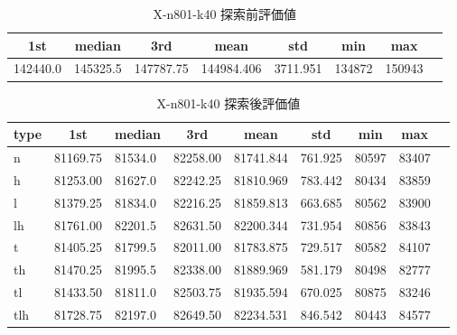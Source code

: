 \begin{table}[htbp]
    \centering
    \caption{X-n801-k40 探索前評価値}
    \begin{tabular}{|l|l|l|l|l|l|l|l|}\hline
    \multicolumn{1}{|c|}{\textbf{1st}}
    &\multicolumn{1}{c|}{\textbf{median}}
    &\multicolumn{1}{c|}{\textbf{3rd}}
    &\multicolumn{1}{c|}{\textbf{mean}}
    &\multicolumn{1}{c|}{\textbf{std}}
    &\multicolumn{1}{c|}{\textbf{min}}
    &\multicolumn{1}{c|}{\textbf{max}}\\\hline
	142440.0 & 145325.5 & 147787.75 & 144984.406 & 3711.951 & 134872 & 150943\\\hline
	\end{tabular}
\end{table}
\begin{table}[htbp]
    \centering
    \caption{X-n801-k40 探索後評価値}
    \begin{tabular}{|l|l|l|l|l|l|l|l|l|}\hline
    \multicolumn{1}{|c|}{\textbf{type}}
    &\multicolumn{1}{|c|}{\textbf{1st}}
    &\multicolumn{1}{c|}{\textbf{median}}
    &\multicolumn{1}{c|}{\textbf{3rd}}
    &\multicolumn{1}{c|}{\textbf{mean}}
    &\multicolumn{1}{c|}{\textbf{std}}
    &\multicolumn{1}{c|}{\textbf{min}}
    &\multicolumn{1}{c|}{\textbf{max}}\\\hline
	n & 81169.75 & 81534.0 & 82258.00 & 81741.844 & 761.925 & 80597 & 83407\\\hline
	h & 81253.00 & 81627.0 & 82242.25 & 81810.969 & 783.442 & 80434 & 83859\\\hline
	l & 81379.25 & 81834.0 & 82216.25 & 81859.813 & 663.685 & 80562 & 83900\\\hline
	lh & 81761.00 & 82201.5 & 82631.50 & 82200.344 & 731.954 & 80856 & 83843\\\hline
	t & 81405.25 & 81799.5 & 82011.00 & 81783.875 & 729.517 & 80582 & 84107\\\hline
	th & 81470.25 & 81995.5 & 82338.00 & 81889.969 & 581.179 & 80498 & 82777\\\hline
	tl & 81433.50 & 81811.0 & 82503.75 & 81935.594 & 670.025 & 80875 & 83246\\\hline
	tlh & 81728.75 & 82197.0 & 82649.50 & 82234.531 & 846.542 & 80443 & 84577\\\hline
	\end{tabular}
\end{table}

